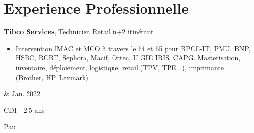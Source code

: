 \documentclass[12pt, letterpaper]{article}
\newenvironment{highlights}{
        \begin{itemize}[
                topsep=0pt,
                parsep=0.10 cm,
                partopsep=0pt,
                itemsep=0pt,
                after=\vspace{-1\baselineskip},
                leftmargin=0.4 cm + 3pt
            ]
    }{
        \end{itemize}
    } %
\let\originalTabularx\tabularx
\let\originalEndTabularx\endtabularx
\renewenvironment{tabularx}{\bgroup\centering\originalTabularx}{\originalEndTabularx\par\egroup}
\begin{document}
\section{Experience Professionnelle}

\begin{tabularx}{
	\textwidth-0.4 cm-0.13cm
	}{
	K{0.2 cm}
	R{4.1 cm}
	}
	\textbf{Tibco Services}, Technicien Retail n+2 itinérant
	
	\vspace{0.10 cm}
	
	\begin{highlights}
	\item Intervention IMAC et MCO à travers le 64 et 65 pour BPCE-IT, PMU, BNP, HSBC, RCBT, Sephora, Macif, Ortec, U GIE IRIS, CAPG. Masterisation, inventaire, déploiement, logistique, retail (TPV, TPE...), imprimante (Brother, HP, Lexmark)
	\end{highlights}
	  &   
	Jan. 2022
	            
	CDI - 2,5 ans
	            
	Pau
\end{tabularx}
\end{document}
